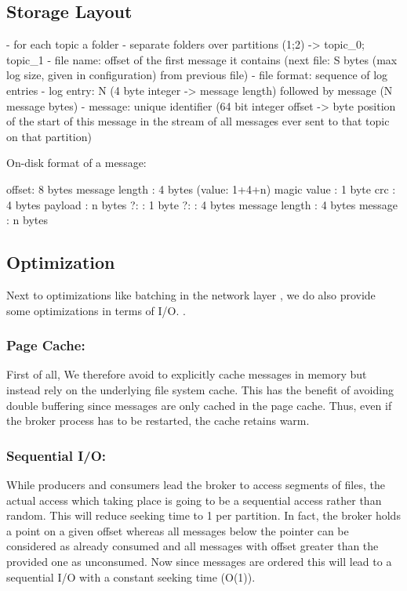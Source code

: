 \subsection{Storage Layout}

- for each topic a folder
- separate folders over partitions (1;2) -> topic\_0; topic\_1
- file name: offset of the first message it contains (next file: S bytes (max log size, given in configuration) from previous file)
- file format: sequence of log entries
- log entry: N (4 byte integer -> message length) followed by message (N message bytes)
- message: unique identifier (64 bit integer offset -> byte position of the start of this message in the stream of all messages ever sent to that topic on that partition)

On-disk format of a message:

offset: 8 bytes
message length : 4 bytes (value: 1+4+n) 
magic value  : 1 byte
crc            : 4 bytes
payload        : n bytes
    ?:              : 1 byte
    ?:              : 4 bytes
    message length  : 4 bytes
    message         : n bytes

\subsection{Optimization}

Next to optimizations like batching in the network layer ,
we do also provide some optimizations in terms of I/O. .

\subsubsection{Page Cache:}

First of all, We therefore avoid to explicitly cache messages in memory but
instead rely on the underlying file system cache. This has the benefit of
avoiding double buffering since messages are only cached in the page cache.
Thus, even if the broker process has to be restarted, the cache retains warm.


\subsubsection{Sequential I/O: }

While producers and consumers lead the broker to access
segments of files, the actual access which taking place is going to be a
sequential access rather than random. This will reduce seeking time to 1 per
partition. In fact, the broker holds a point on a given offset whereas all
messages below the pointer can be considered as already consumed and all
messages with offset greater than the provided one as unconsumed. Now since
messages are ordered this will lead to a sequential I/O with a constant seeking
time (O(1)).


